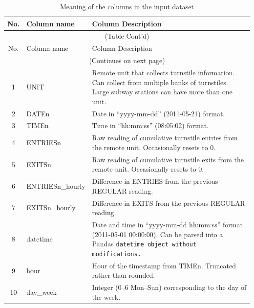 \documentclass{article}
\begin{document}
\begin{longtable}[h]{c|l|p{8cm}}

\hline
No. & Column name & Column Description \\[3pt]
\hline
\endfirsthead

\multicolumn{3}{c}{(Table Cont'd)}\\
\hline
No. & Column name & Column Description \\[3pt]
\hline

\endhead

\hline
\multicolumn{3}{c}{(Continues on next page)}\\
\endfoot


\hline
\caption{Meaning of the columns in the input dataset
\label{tab:col_meaning}}
\endlastfoot

 1 & UNIT & Remote unit that collects turnstile information. Can collect from multiple banks of turnstiles. Large subway stations can have more than one unit. \\[3pt]
 
2 & DATEn & Date in “yyyy-mm-dd” (2011-05-21) format. \\[3pt]

3 & TIMEn & Time in “hh:mm:ss” (08:05:02) format. \\[3pt]

4 & ENTRIESn & Raw reading of cumulative turnstile entries from the remote unit. Occasionally resets to 0. \\[3pt]

5 & EXITSn & Raw reading of cumulative turnstile exits from the remote unit. Occasionally resets to 0. \\[3pt]

6 & ENTRIESn\_hourly & Difference in ENTRIES from the previous REGULAR reading.\\[3pt] 

7 & EXITSn\_hourly & Difference in EXITS from the previous REGULAR reading. \\[3pt]

8 & datetime & Date and time in “yyyy-mm-dd hh:mm:ss” format (2011-05-01 00:00:00). Can be parsed into a Pandas \tt datetime \rm object without modifications. \\[3pt]

9 & hour & Hour of the timestamp from TIMEn. Truncated rather than rounded. \\[3pt]

10 & day\_week & Integer (0--6 Mon--Sun) corresponding to the day of the week. \\[3pt]


\end{longtable}
\end{document}
